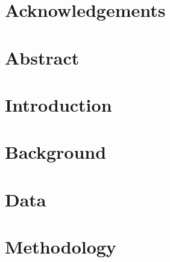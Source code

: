 \documentclass[english, a4paper, 12pt, twoside]{article}
\numberwithin{equation}{section} %
\begin{document}

\restoregeometry %

\thispagestyle{plain} %
\clearpage\mbox{}\clearpage %

\newpage
\section*{Acknowledgements}
    

\newpage
\section*{Abstract}
    

\newpage
{ %
\tableofcontents
}

\newpage
{ 
\listoffigures}
 
\newpage
{ 
\listoftables}

\newpage
{} %
\setcounter{page}{1} %

\section{Introduction} %
\clearpage %

\section{Background}
    
\clearpage

\section{Data}


    
\clearpage

\section{Methodology}
    
\clearpage
  
\end{document}
